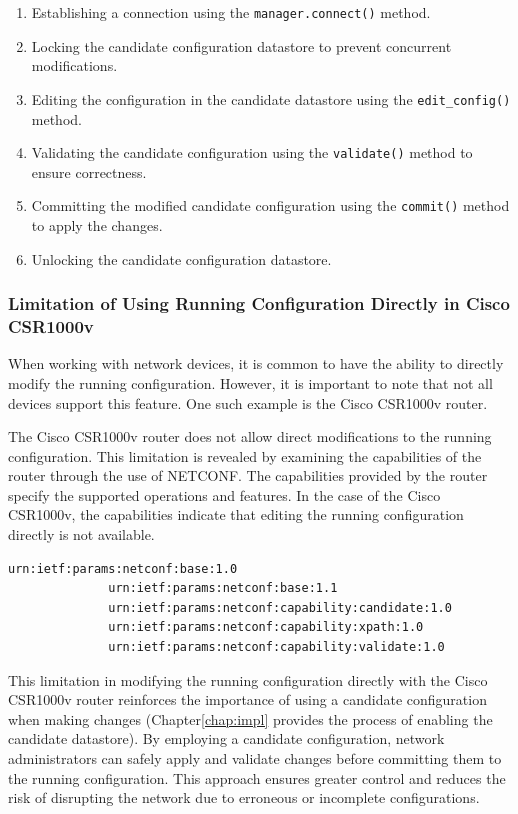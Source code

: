 \begin{enumerate}
  \item Establishing a connection using the \texttt{manager.connect()} method.
  \item Locking the candidate configuration datastore to prevent concurrent modifications.
  \item Editing the configuration in the candidate datastore using the \texttt{edit\_config()} method.
  \item Validating the candidate configuration using the \texttt{validate()} method to ensure correctness.
  \item Committing the modified candidate configuration using the \texttt{commit()} method to apply the changes.
  \item Unlocking the candidate configuration datastore.
\end{enumerate}

\subsubsection{Limitation of Using Running Configuration Directly in Cisco CSR1000v}

When working with network devices, it is common to have the ability to directly modify the running configuration. However, it is important to note that not all devices support this feature. One such example is the Cisco CSR1000v router.

The Cisco CSR1000v router does not allow direct modifications to the running configuration. This limitation is revealed by examining the capabilities of the router through the use of NETCONF. The capabilities provided by the router specify the supported operations and features. In the case of the Cisco CSR1000v, the capabilities indicate that editing the running configuration directly is not available.
\begin{lstlisting}[style=pythonStyle, caption={Router CSR1000v capabilities \cite{github}.}, backgroundcolor=\color{codebackground}]
              urn:ietf:params:netconf:base:1.0
              urn:ietf:params:netconf:base:1.1
              urn:ietf:params:netconf:capability:candidate:1.0
              urn:ietf:params:netconf:capability:xpath:1.0
              urn:ietf:params:netconf:capability:validate:1.0
\end{lstlisting}

This limitation in modifying the running configuration directly with the Cisco CSR1000v router reinforces the importance of using a candidate configuration when making changes (Chapter\ref{chap:impl} provides the process of enabling the candidate datastore). By employing a candidate configuration, network administrators can safely apply and validate changes before committing them to the running configuration. This approach ensures greater control and reduces the risk of disrupting the network due to erroneous or incomplete configurations.

